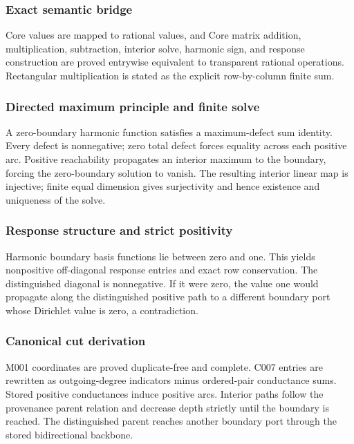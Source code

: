 \subsubsection{Exact semantic bridge}\label{exact-semantic-bridge}

Core \texttt{\protect{}} values are mapped to rational values, and
Core matrix addition, multiplication, subtraction, interior solve,
harmonic sign, and response construction are proved entrywise equivalent
to transparent rational operations. Rectangular multiplication is stated
as the explicit row-by-column finite sum.

\subsubsection{Directed maximum principle and finite
solve}\label{directed-maximum-principle-and-finite-solve}

A zero-boundary harmonic function satisfies a maximum-defect sum
identity. Every defect is nonnegative; zero total defect forces equality
across each positive arc. Positive reachability propagates an interior
maximum to the boundary, forcing the zero-boundary solution to vanish.
The resulting interior linear map is injective; finite equal dimension
gives surjectivity and hence existence and uniqueness of the solve.

\subsubsection{Response structure and strict
positivity}\label{response-structure-and-strict-positivity}

Harmonic boundary basis functions lie between zero and one. This yields
nonpositive off-diagonal response entries and exact row conservation.
The distinguished diagonal is nonnegative. If it were zero, the value
one would propagate along the distinguished positive path to a different
boundary port whose Dirichlet value is zero, a contradiction.

\subsubsection{Canonical cut derivation}\label{canonical-cut-derivation}

M001 coordinates are proved duplicate-free and complete. C007 entries
are rewritten as outgoing-degree indicators minus ordered-pair
conductance sums. Stored positive conductances induce positive arcs.
Interior paths follow the provenance parent relation and decrease depth
strictly until the boundary is reached. The distinguished parent reaches
another boundary port through the stored bidirectional backbone.

